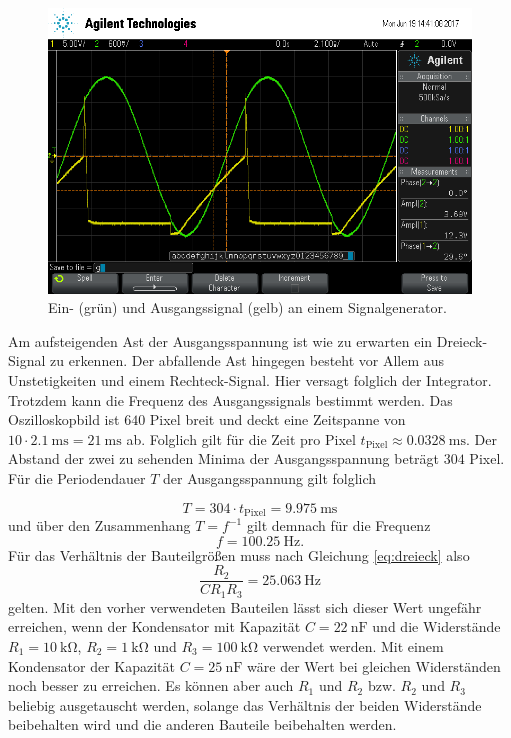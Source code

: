 \begin{figure}[H]
  \centering
  \includegraphics[width=\textwidth]{signalgen.png}
  \caption{Ein- (grün) und Ausgangssignal (gelb) an einem Signalgenerator\cite{ahlmann_2021}.}
  \label{fig:signalgenerator_oszi}
\end{figure}
Am aufsteigenden Ast der Ausgangsspannung ist wie zu erwarten ein Dreieck-Signal zu erkennen. Der abfallende Ast hingegen besteht vor Allem aus Unstetigkeiten und einem Rechteck-Signal. Hier versagt folglich der Integrator. Trotzdem kann die Frequenz des Ausgangssignals bestimmt werden. Das Oszilloskopbild ist $640$ Pixel breit und deckt eine Zeitspanne von $10 \cdot \SI{2.1}{\milli\second} = \SI{21}{\milli\second}$ ab. Folglich gilt für die Zeit pro Pixel $t_\mathrm{Pixel} \approx \SI{0.0328}{\milli\second}$. Der Abstand der zwei zu sehenden Minima der Ausgangsspannung beträgt $304$ Pixel. Für die Periodendauer $T$ der Ausgangsspannung gilt folglich

\begin{equation*}
  T = 304 \cdot t_\mathrm{Pixel} = \SI{9.975}{\milli\second}
\end{equation*}
und über den Zusammenhang $T = f^{-1}$ gilt demnach für die Frequenz
\begin{equation*}
  f = \SI{100.25}{\hertz}.
\end{equation*}
Für das Verhältnis der Bauteilgrößen muss nach Gleichung \eqref{eq:dreieck} also
\begin{equation*}
  \frac{R_2}{C R_1 R_3} = \SI{25.063}{\hertz}
\end{equation*}
gelten. Mit den vorher verwendeten Bauteilen lässt sich dieser Wert ungefähr erreichen, wenn der Kondensator mit Kapazität $C = \SI{22}{\nano\farad}$ und die Widerstände $R_1 = \SI{10}{\kilo\ohm}$, $R_2 = \SI{1}{\kilo\ohm}$ und $R_3 = \SI{100}{\kilo\ohm}$ verwendet werden. Mit einem Kondensator der Kapazität $C = \SI{25}{\nano\farad}$ wäre der Wert bei gleichen Widerständen noch besser zu erreichen.
Es können aber auch $R_1$ und $R_2$ bzw. $R_2$ und $R_3$ beliebig ausgetauscht werden, solange das Verhältnis der beiden Widerstände beibehalten wird und die anderen Bauteile beibehalten werden.
